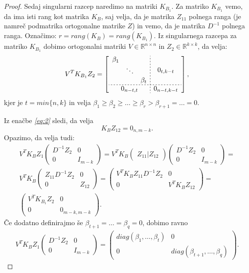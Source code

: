 \documentclass[mat1]{article}
\begin{document}
\begin{proof}
Sedaj singularni razcep naredimo na matriki $K_{B_1}$. Za matriko $K_{B_1}$ vemo, da ima isti rang kot matrika $K_B$, saj velja, da je matrika $Z_{11}$ polnega ranga (je namreč podmatrika ortogonalne matrike $Z$) in vemo, da je matrika $D^{-1}$ polnega ranga. Označimo: $r = rang(K_B) = rang(K_{B_1})$. Iz singularnega razcepa za matriko $K_{B_1}$ dobimo ortogonalni matriki $V \in \mathbb{R}^{ n \times n}$ in $Z_2 \in \mathbb{R}^{ k \times k}$, da velja:
\begin{gather*}
V^T K_{B_1} Z_2 = 
\left[
\begin{array}{c;{2pt/2pt}c}
\begin{matrix}
\beta_1 & & \\
 & \ddots & \\
 & & \beta_t
\end{matrix} & 0_{t, k - t}
 \\ \hdashline[2pt/2pt]
0_{n-t, t} & 0_{n-t, k-t}
\end{array} \right] \text{,} 
\end{gather*}
kjer je $t = min\{n, k\}$ in velja 
$ \beta_1 \geq \beta_2 \geq \ldots \geq \beta_r > \beta_{r+1} = \ldots = 0 $.

Iz enačbe \textit{\eqref{eq:2}} sledi, da velja
$$
K_B Z_{12} = 0_{n, m-k} \text{.}
$$
Opazimo, da velja tudi:
\begin{gather*}
V^T K_B Z_1
\begin{pmatrix}
D^{-1} Z_2 & 0\\ 
0 & I_{m-k}
\end{pmatrix} = 
V^T K_B \left(\begin{array}{c} Z_{11} | Z_{12} \end{array}\right)
\begin{pmatrix}
D^{-1} Z_2 & 0\\ 
0 & I_{m-k}
\end{pmatrix} = \\
V^T K_B
\begin{pmatrix}
 Z_{11} D^{-1} Z_2 & 0\\ 
0 & Z_{12} 
\end{pmatrix} =
\begin{pmatrix}
V^T K_B Z_{11} D^{-1} Z_2 & 0\\ 
0 & V^T K_B Z_{12} 
\end{pmatrix} = \\
\begin{pmatrix}
V^T K_{B_1} Z_2 & 0\\ 
0 & 0_{m-k, m-k} 
\end{pmatrix}\text{.}
\end{gather*}
Če dodatno definirajmo še $\beta_{t+1} = \ldots = \beta_{q} = 0$, dobimo ravno
\begin{gather*}
V^T K_B Z_1
\begin{pmatrix}
D^{-1} Z_2 & 0\\ 
0 & I_{m-k}
\end{pmatrix} = 
\begin{pmatrix}
diag(\beta_1, \ldots, \beta_t) & 0\\ 
0 & diag(\beta_{t+1}, \ldots, \beta_q)
\end{pmatrix} \text{.}
\end{gather*}


\end{proof}
\end{document}

